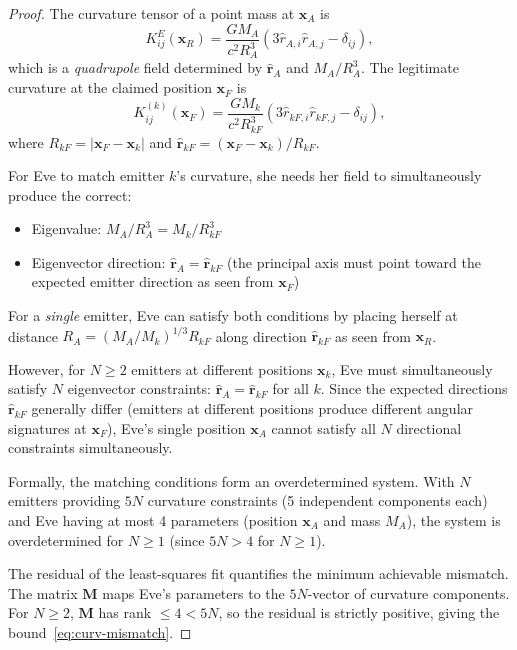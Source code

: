 \documentclass[twocolumn,superscriptaddress,prd,nofootinbib]{revtex4-2}
\newcommand{\xvec}{\mathbf{x}}
\newcommand{\rvec}{\mathbf{r}}
\begin{document}
\begin{proof}
The curvature tensor of a point mass at $\xvec_A$ is
\begin{equation}
K_{ij}^E(\xvec_R) = \frac{GM_A}{c^2 R_A^3}(3\hat{r}_{A,i}\hat{r}_{A,j}
- \delta_{ij}),
\end{equation}
which is a \emph{quadrupole} field determined by $\hat{\rvec}_A$ and
$M_A/R_A^3$. The legitimate curvature at the claimed position
$\xvec_F$ is
\begin{equation}
K_{ij}^{(k)}(\xvec_F) = \frac{GM_k}{c^2 R_{kF}^3}
(3\hat{r}_{kF,i}\hat{r}_{kF,j} - \delta_{ij}),
\end{equation}
where $R_{kF} = |\xvec_F - \xvec_k|$ and
$\hat{\rvec}_{kF} = (\xvec_F - \xvec_k)/R_{kF}$.

For Eve to match emitter $k$'s curvature, she needs her field to
simultaneously produce the correct:
\begin{itemize}
\item Eigenvalue: $M_A/R_A^3 = M_k/R_{kF}^3$
\item Eigenvector direction: $\hat{\rvec}_A = \hat{\rvec}_{kF}$
(the principal axis must point toward the expected emitter direction
as seen from $\xvec_F$)
\end{itemize}
For a \emph{single} emitter, Eve can satisfy both conditions by placing
herself at distance $R_A = (M_A/M_k)^{1/3}R_{kF}$ along direction
$\hat{\rvec}_{kF}$ as seen from $\xvec_R$.

However, for $N \geq 2$ emitters at different positions $\xvec_k$, Eve
must simultaneously satisfy $N$ eigenvector constraints:
$\hat{\rvec}_A = \hat{\rvec}_{kF}$ for all $k$. Since the expected
directions $\hat{\rvec}_{kF}$ generally differ (emitters at different
positions produce different angular signatures at $\xvec_F$), Eve's
single position $\xvec_A$ cannot satisfy all $N$ directional
constraints simultaneously.

Formally, the matching conditions form an overdetermined system. With
$N$ emitters providing $5N$ curvature constraints (5 independent
components each) and Eve having at most 4 parameters (position $\xvec_A$
and mass $M_A$), the system is overdetermined for $N \geq 1$ (since
$5N > 4$ for $N \geq 1$).

The residual of the least-squares fit quantifies the minimum achievable
mismatch. The matrix $\mathbf{M}$ maps Eve's parameters to the
$5N$-vector of curvature components. For $N \geq 2$, $\mathbf{M}$ has
rank $\leq 4 < 5N$, so the residual is strictly positive, giving
the bound~\eqref{eq:curv-mismatch}.
\end{proof}
\end{document}

